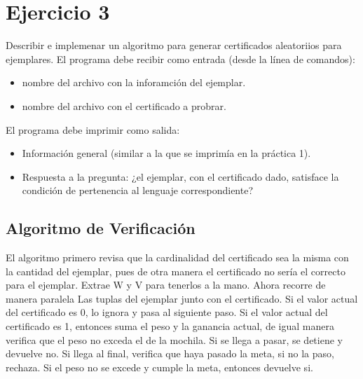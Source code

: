 
\section{Ejercicio 3}

\begin{tcolorbox}[enunciado]
Describir e implemenar un algoritmo para generar certificados aleatoriios para ejemplares. El programa debe recibir como entrada (desde la línea de comandos):
\begin{itemize}
    \item nombre del archivo con la inforamción del ejemplar.
    \item nombre del archivo con el certificado a probrar.
\end{itemize}
El programa debe imprimir como salida:
\begin{itemize}
    \item Información general (similar a la que se imprimía en la práctica 1).
    \item Respuesta a la pregunta: ¿el ejemplar, con el certificado dado, satisface la condición de pertenencia al lenguaje correspondiente?
\end{itemize}
\end{tcolorbox}

\subsection{Algoritmo de Verificación}
El algoritmo primero revisa que la cardinalidad del certificado sea la misma con la cantidad del ejemplar, pues de otra manera el certificado no sería el correcto para el ejemplar.
Extrae W y V para tenerlos a la mano.
Ahora recorre de manera paralela Las tuplas del ejemplar junto con el certificado. Si el valor actual del certificado es 0, lo ignora y pasa al siguiente paso.
Si el valor actual del certificado es 1, entonces suma el peso y la ganancia actual, de igual manera verifica que el peso no exceda el de la mochila.
Si se llega a pasar, se detiene y devuelve no.
Si llega al final, verifica que haya pasado la meta, si no la paso, rechaza. Si el peso no se excede y cumple la meta, entonces devuelve si.

